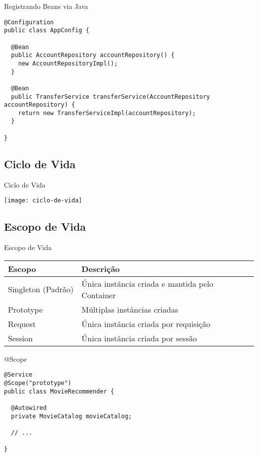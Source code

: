 \documentclass{beamer}
\begin{document}
\begin{frame}[fragile]{Registrando Beans via Java}
 \begin{verbatim}
@Configuration
public class AppConfig {

  @Bean
  public AccountRepository accountRepository() {
    new AccountRepositoryImpl();
  }

  @Bean
  public TransferService transferService(AccountRepository accountRepository) {
    return new TransferServiceImpl(accountRepository);
  }

}
  \end{verbatim}
\end{frame}

\subsection{Ciclo de Vida}

\begin{frame}{Ciclo de Vida}
 \begin{center}
    \texttt{[image: ciclo-de-vida]}
  \end{center}
\end{frame}

\subsection{Escopo de Vida}

\begin{frame}{Escopo de Vida}
 \begin{table}[]
  \begin{tabular}{@{}ll@{}}
    \toprule
    Escopo             & Descrição                                           \\ \midrule
    Singleton (Padrão) & Única instância criada e mantida pelo Container     \\
    Prototype          & Múltiplas instâncias criadas                        \\
    Request            & Única instância criada por requisição               \\
    Session            & Única instância criada por sessão                   \\ \bottomrule
  \end{tabular}
 \end{table}
\end{frame}

\begin{frame}[fragile]{@Scope}
 \begin{verbatim}
@Service
@Scope("prototype")
public class MovieRecommender {

  @Autowired
  private MovieCatalog movieCatalog;

  // ...
  
}
  \end{verbatim}
\end{frame}
\end{document}
